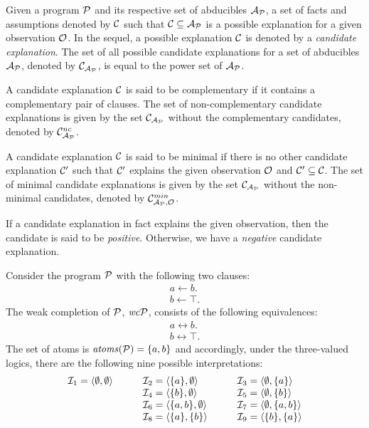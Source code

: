 \begin{definition}
\normalfont
Given a program $\mathcal{P}$ and its respective set of abducibles $\mathcal{A}_{\mathcal{P}}$, a set of facts and assumptions denoted by $\mathcal{C}$ such that $\mathcal{C} \subseteq \mathcal{A}_{\mathcal{P}}$ is a possible explanation for a given observation $\mathcal{O}$. In the sequel, a possible explanation $\mathcal{C}$ is denoted by a \textit{candidate explanation}. The set of all possible candidate explanations for a set of abducibles $\mathcal{A}_{\mathcal{P}}$, denoted by $\mathcal{C}_{\mathcal{A}_{\mathcal{P}}}$, is equal to the power set of $\mathcal{A}_{\mathcal{P}}$. 

A candidate explanation $\mathcal{C}$ is said to be complementary if it contains a complementary pair of clauses. The set of non-complementary candidate explanations is given by the set $\mathcal{C}_{\mathcal{A}_{\mathcal{P}}}$ without the complementary candidates, denoted by $\mathcal{C}_{\mathcal{A}_{\mathcal{P}}}^{nc}$. 

A candidate explanation $\mathcal{C}$ is said to be minimal if there is no other candidate explanation $\mathcal{C}'$ such that $\mathcal{C}'$ explains the given observation $\mathcal{O}$ and $\mathcal{C}' \subseteq \mathcal{C}$. The set of minimal candidate explanations is given by the set $\mathcal{C}_{\mathcal{A}_{\mathcal{P}}}$ without the non-minimal candidates, denoted by $\mathcal{C}_{\mathcal{A}_{\mathcal{P}},\mathcal{O}}^{min}$.

If a candidate explanation in fact explains the given observation, then the candidate is said to be \textit{positive}. Otherwise, we have a \textit{negative} candidate explanation.

\newpage
\vspace*{\fill}
\begin{tcolorbox}
\begin{example}
\label{example:interpretations}
\normalfont 
Consider the program $\mathcal{P}$ with the following two clauses:
\[
\begin{array}{lcl}
a \leftarrow b. \\
b \leftarrow \top.
\end{array}
\]
The weak completion of $\mathcal{P}$, $\mathit{wc}\mathcal{P}$, consists of the following equivalences:
\[
\begin{array}{lcl}
a \leftrightarrow b. \\
b \leftrightarrow \top.
\end{array}
\]
The set of atoms is $\mathit{atoms}(\mathcal{P}) = \{a, b\}$ and accordingly, under the three-valued logics, there are the following nine possible interpretations:
 \[
\begin{array}{lllll}
\mathcal{I}_1 = \langle \emptyset, \emptyset \rangle   & \quad & \mathcal{I}_2 = \langle \{a\}, \emptyset \rangle &\quad& \mathcal{I}_3 = \langle \emptyset , \{a\} \rangle \\
			       			& \quad &\mathcal{I}_4 = \langle \{b\}, \emptyset  \rangle &\quad& \mathcal{I}_5 = \langle \emptyset , \{b\} \rangle \\
			       			& \quad &\mathcal{I}_6 = \langle \{a,b\}, \emptyset  \rangle &\quad& \mathcal{I}_7 = \langle\emptyset , \{a, b\}\rangle \\
			       			& \quad &\mathcal{I}_8 = \langle \{a\}, \{b\} \rangle &\quad& \mathcal{I}_9 = \langle \{b\},\{a\} \rangle \\
\end{array}
\]


\end{example}
\end{tcolorbox}
\end{definition}
